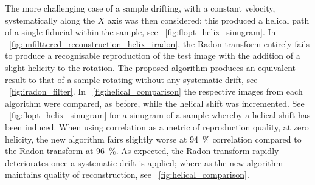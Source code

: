 The more challenging case of a sample drifting, with a constant velocity, systematically along the \(X\) axis was then considered; this produced a helical path of a single fiducial within the sample, see \figurename~\ref{fig:flopt_helix_sinugram}.
In \figurename~\ref{fig:unfilttered_reconstruction_helix_iradon}, the \gls{Radon transform} entirely fails to produce a recognisable reproduction of the test image with the addition of a slight helicity to the rotation.
The proposed algorithm produces an equivalent result to that of a sample rotating without any systematic drift, see \figurename~\ref{fig:iradon_filter}.
In \figurename~\ref{fig:helical_comparison} the respective images from each algorithm were compared, as before, while the helical shift was incremented.
See \figurename~\ref{fig:flopt_helix_sinugram} for a \gls{sinugram} of a sample whereby a helical shift has been induced.
When using correlation as a metric of reproduction quality, at zero helicity, the new algorithm fairs slightly worse at \SI{94}{\percent} correlation compared to the \gls{Radon transform} at \SI{96}{\percent}.
As expected, the \gls{Radon transform} rapidly deteriorates once a systematic drift is applied; where-as the new algorithm maintains quality of reconstruction, see \figurename~\ref{fig:helical_comparison}.

